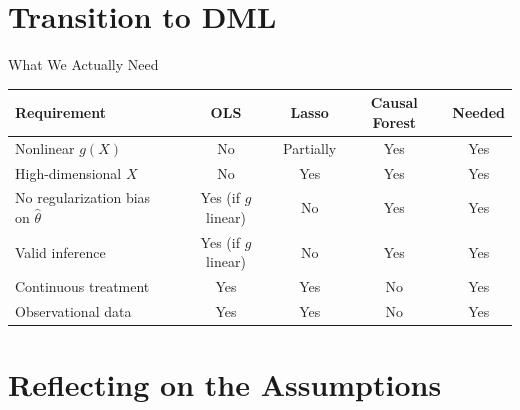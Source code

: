 \documentclass[aspectratio=169, 11pt]{beamer}
\begin{document}
\section{Transition to DML}

\begin{frame}{What We Actually Need}

\begin{center}
\begin{tabular}{lcccc}
\toprule
\textbf{Requirement} & \textbf{OLS} & \textbf{Lasso} & \textbf{Causal Forest} & \textbf{Needed} \\
\midrule
Nonlinear $g(X)$            & \textcolor{warnred}{No}  & Partially & \textcolor{noteblue}{Yes} & \textcolor{noteblue}{Yes} \\
High-dimensional $X$        & \textcolor{warnred}{No}  & \textcolor{noteblue}{Yes} & \textcolor{noteblue}{Yes} & \textcolor{noteblue}{Yes} \\
No regularization bias on $\hat{\theta}$    & \textcolor{noteblue}{Yes (if $g$ linear)} & \textcolor{warnred}{No}  & \textcolor{noteblue}{Yes} & \textcolor{noteblue}{Yes} \\
Valid inference              & \textcolor{noteblue}{Yes (if $g$ linear)} & \textcolor{warnred}{No}  & \textcolor{noteblue}{Yes} & \textcolor{noteblue}{Yes} \\
Continuous treatment         & \textcolor{noteblue}{Yes} & \textcolor{noteblue}{Yes} & \textcolor{warnred}{No}  & \textcolor{noteblue}{Yes} \\
Observational data         & \textcolor{noteblue}{Yes} & \textcolor{noteblue}{Yes} & \textcolor{warnred}{No}  & \textcolor{noteblue}{Yes} \\
\bottomrule
\end{tabular}
\end{center}

\end{frame}


\section{Reflecting on the Assumptions}
\end{document}
